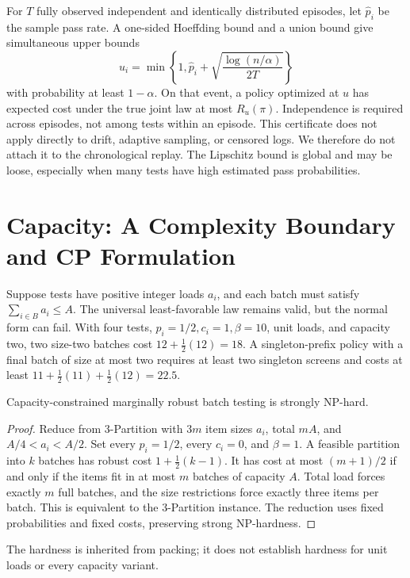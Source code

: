 \documentclass[runningheads]{llncs}
\begin{document}
For $T$ fully observed independent and identically distributed episodes,
let $\widehat p_i$ be the sample pass rate. A one-sided Hoeffding bound
\cite{hoeffding1963} and a union bound give simultaneous upper bounds
\[
u_i=\min\left\{1,\widehat p_i+
\sqrt{\frac{\log(n/\alpha)}{2T}}\right\}
\]
with probability at least $1-\alpha$. On that event, a policy optimized at
$u$ has expected cost under the true joint law at most $R_u(\pi)$.
Independence is required across episodes, not among tests within an episode.
This certificate does not apply directly to drift, adaptive sampling, or
censored logs. We therefore do not attach it to the chronological replay.
The Lipschitz bound is global and may be loose, especially when many tests
have high estimated pass probabilities.

\section{Capacity: A Complexity Boundary and CP Formulation}
Suppose tests have positive integer loads $a_i$, and each batch must satisfy
$\sum_{i\in B}a_i\leq A$. The universal least-favorable law remains valid,
but the normal form can fail. With four tests, $p_i=1/2,c_i=1,\beta=10$,
unit loads, and capacity two, two size-two batches cost
$12+\tfrac12(12)=18$. A singleton-prefix policy with a final batch of size
at most two requires at least two singleton screens and costs at least
$11+\tfrac12(11)+\tfrac12(12)=22.5$.

\begin{theorem}\label{thm:hard}
Capacity-constrained marginally robust batch testing is strongly NP-hard.
\end{theorem}
\begin{proof}
Reduce from 3-Partition with $3m$ item sizes $a_i$, total $mA$, and
$A/4<a_i<A/2$. Set every $p_i=1/2$, every $c_i=0$, and $\beta=1$.
A feasible partition into $k$ batches has robust cost
$1+\tfrac12(k-1)$. It has cost at most $(m+1)/2$ if and only if
the items fit in at most $m$ batches of capacity $A$. Total load forces
exactly $m$ full batches, and the size restrictions force exactly three
items per batch. This is equivalent to the 3-Partition instance.
The reduction uses fixed probabilities and fixed costs, preserving strong
NP-hardness.
\end{proof}
The hardness is inherited from packing; it does not establish hardness for
unit loads or every capacity variant.
\end{document}
